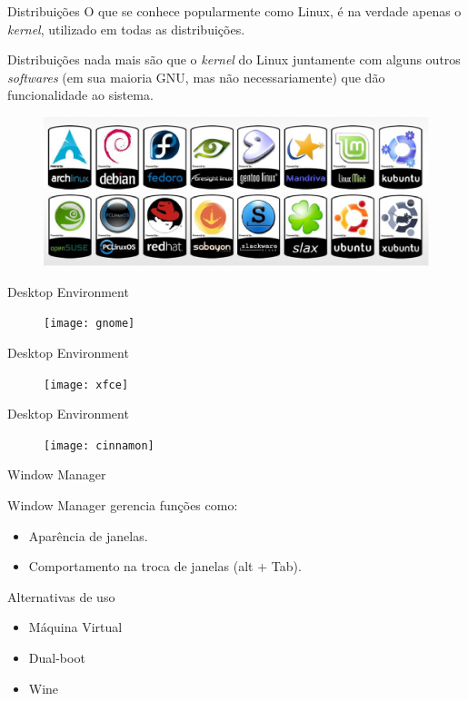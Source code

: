 \documentclass[size=14pt,
style=paintings
]{powerdot}
\newenvironment{vslide}{\vspace{\stretch{1}}}{\vspace{\stretch{1}}}
\begin{document}
\begin{slide}{Distribuições}
\begin{vslide}
O que se conhece popularmente como Linux, é na verdade apenas o \textit{kernel}, utilizado em todas as distribuições.

\vspace{0.5cm}
Distribuições nada mais são que o \textit{kernel} do Linux juntamente com alguns outros \textit{softwares} (em sua maioria GNU, mas não necessariamente) que dão funcionalidade ao sistema.

   \begin{figure}[!h]
  \includegraphics[scale=0.4]{distro}  
   \end{figure}
\end{vslide}
\end{slide}

\begin{slide}{Desktop Environment}
  \centering
   \begin{figure}[!h]
  \texttt{[image: gnome]}
   \end{figure}
\end{slide}

\begin{slide}{Desktop Environment}
  \centering
   \begin{figure}[!h]
  \texttt{[image: xfce]}
   \end{figure}
\end{slide}

\begin{slide}{Desktop Environment}
  \centering
   \begin{figure}[!h]
  \texttt{[image: cinnamon]}
   \end{figure}
\end{slide}

\begin{slide}{Window Manager}
\begin{vslide}

Window Manager gerencia funções como:

\begin{itemize}
\item Aparência de janelas.
\item Comportamento na troca de janelas (alt + Tab).
\end{itemize}

\end{vslide}
\end{slide}

\begin{slide}{Alternativas de uso}
\begin{vslide}

\begin{itemize}
\item Máquina Virtual
\item Dual-boot
\item Wine
\end{itemize}

\end{vslide}
\end{slide}
\end{document}
